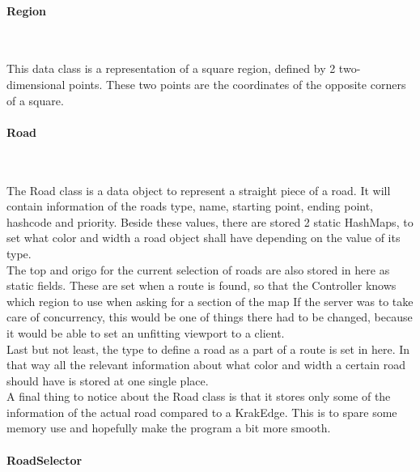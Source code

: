 \documentclass[a4paper,10pt,titlepage]{article}
\begin{document}
				\paragraph{Region}\mbox{}\
				
This data class is a representation of a square region, defined by 2 two-dimensional points. These two points are the coordinates of the opposite corners of a square.
				
				\paragraph{Road}\mbox{}\
				
The Road class is a data object to represent a straight piece of a road. It will contain information of the roads type, name, starting point, ending point, hashcode and priority. Beside these values, there are stored 2 static HashMaps, to set what color and width a road object shall have depending on the value of its type. \\
The top and origo for the current selection of roads are also stored in here as static fields. These are set when a route is found, so that the Controller knows which region to use when asking for a section of the map
If the server was to take care of concurrency, this would be one of things there had to be changed, because it would be able to set an unfitting viewport to a client.\\
Last but not least, the type to define a road as a part of a route is set in here. In that way all the relevant information about what color and width a certain road should have is stored at one single place.\\
A final thing to notice about the Road class is that it stores only some of the information of the actual road compared to a KrakEdge. This is to spare some memory use and hopefully make the program a bit more smooth.\\

				
				\paragraph{RoadSelector}\mbox{}\
				
\end{document}
